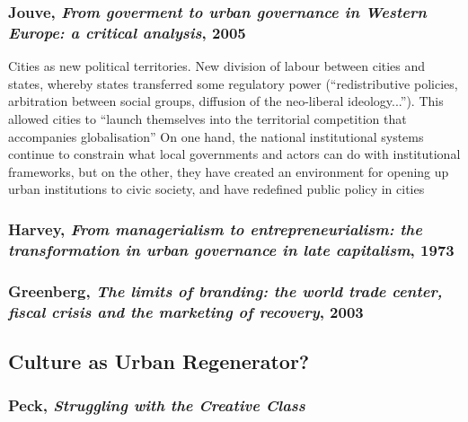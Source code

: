\documentclass{article}
\begin{document}
\subsubsection{Jouve, \textit{From goverment to urban governance in Western Europe: a critical analysis}, 2005}

\begin{outline}
	\1 Cities as new political territories. New division of labour between cities and states, whereby states transferred some regulatory power (``redistributive policies, arbitration between social groups, diffusion of the neo-liberal ideology...''). This allowed cities to ``launch themselves into the territorial competition that accompanies globalisation''
	\1 On one hand, the national institutional systems continue to constrain what local governments and actors can do with institutional frameworks, but on the other, they have created an environment for opening up urban institutions to civic society, and have redefined public policy in cities
\end{outline}


\subsubsection{Harvey, \textit{From managerialism to entrepreneurialism: the transformation in urban governance in late capitalism}, 1973}

\subsubsection{Greenberg, \textit{The limits of branding: the world trade center, fiscal crisis and the marketing of recovery}, 2003}

\subsection{Culture as Urban Regenerator?}

\subsubsection{Peck, \textit{Struggling with the Creative Class}}
\end{document}
